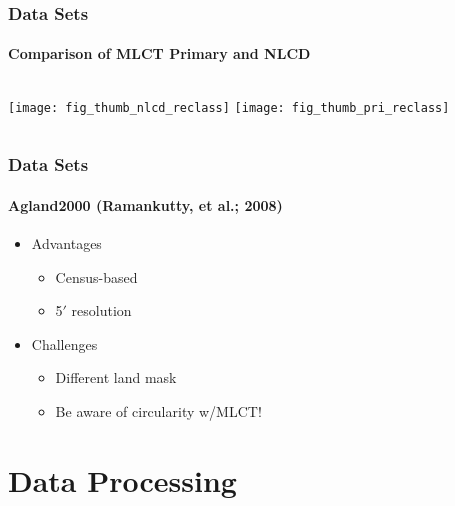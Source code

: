 \documentclass{beamer}
\begin{document}
\begin{frame}
  \frametitle{Data Sets}
  \framesubtitle{Comparison of MLCT Primary and NLCD}
  \begin{columns}
    \column{2.5in}
    \texttt{[image: fig\_thumb\_nlcd\_reclass]}    
    \column{2.5in}
    \texttt{[image: fig\_thumb\_pri\_reclass]}    
  \end{columns}
\end{frame}

\begin{frame}
  \frametitle{Data Sets}
  \framesubtitle{Agland2000 (Ramankutty, et al.; 2008)}
  \begin{itemize}
  \item Advantages
    \begin{itemize}
    \item Census-based
    \item 5$'$ resolution
    \end{itemize}
  \item Challenges
    \begin{itemize}
    \item Different land mask
    \item Be aware of circularity w\slash{}MLCT!
    \end{itemize}
  \end{itemize}
\end{frame}



\section{Data Processing}
\label{sec:subpix}
\end{document}

